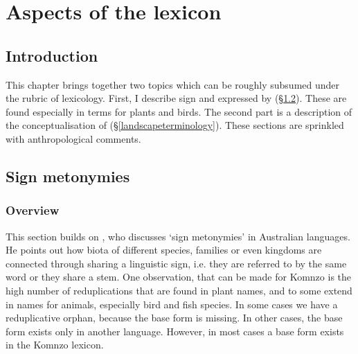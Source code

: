 
\chapter{Aspects of the lexicon} \label{cha:lexicon}

\section{Introduction}

This chapter brings together two topics which can be roughly subsumed under the rubric of lexicology. First, I describe sign  and  expressed by  (\S{}\ref{redupmeton}). These are found especially in terms for plants and birds. The second part is a description of the conceptualisation of  (\S{}\ref{landscapeterminology}). These sections are sprinkled with anthropological comments.

\section{Sign metonymies}\label{redupmeton}

\subsection{Overview}

This section builds on \citep{Evans:1997vj}, who discusses `sign metonymies' in Australian languages. He points out how biota of different species, families or even kingdoms are connected through sharing a linguistic sign, i.e. they are referred to by the same word or they share a stem. One observation, that can be made for Komnzo is the high number of reduplications that are found in plant names, and to some extend in names for animals, especially bird and fish species. In some cases we have a reduplicative orphan, because the base form is missing. In other cases, the base form exists only in another language. However, in most cases a base form exists in the Komnzo lexicon.%

